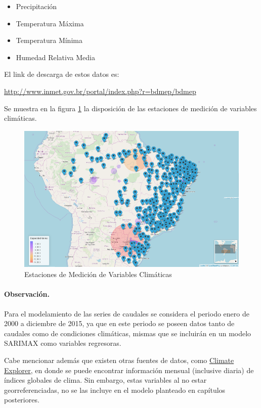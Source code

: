 \documentclass[12pt,oneside]{book}\usepackage[]{graphicx}\usepackage[]{color}
\theoremstyle{definition} %
\begin{document}
\begin{enumerate}
\begin{itemize}


\item Precipitación
\item Temperatura Máxima
\item Temperatura Mínima
\item Humedad Relativa Media


\end{itemize}

El link de descarga de estos datos es:

\url{http://www.inmet.gov.br/portal/index.php?r=bdmep/bdmep}


Se muestra en la figura \ref{fig:mapa_clm} la disposición de las estaciones de medición de variables climáticas.


\begin{figure}[H]
	\centering
	\includegraphics[scale=0.5]{map_estacClm}
	\caption{Estaciones de Medición de Variables Climáticas}\label{fig:mapa_clm}
\end{figure}

\end{enumerate}

\paragraph{Observación.} Para el modelamiento de las series de caudales se considera el periodo enero de 2000 a diciembre de 2015, ya que en este periodo se poseen datos tanto de caudales como de condiciones climáticas, mismas que se incluirán en un modelo SARIMAX como variables regresoras.

Cabe mencionar además que existen otras fuentes de datos, como \href{http://climexp.knmi.nl/start.cgi?id=someone@somewhere}{Climate Explorer}, en donde se puede encontrar información mensual (inclusive diaria) de índices globales de clima. Sin embargo, estas variables al no estar georreferenciadas, no se las incluye en el modelo planteado en capítulos posteriores.
\end{document}
